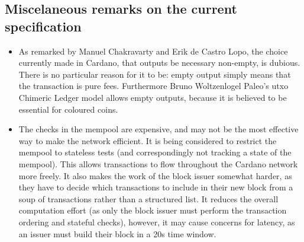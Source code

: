\documentclass{article}
\begin{document}
\subsection{Miscelaneous remarks on the current specification}
\label{sec:misc-remarks}
\begin{itemize}
\item As remarked by Manuel Chakravarty and Erik de Castro Lopo, the
  choice currently made in Cardano, that outputs be necessary
  non-empty, is dubious. There is no particular reason for it to be:
  empty output simply means that the transaction is pure
  fees. Furthermore Bruno Woltzenlogel Paleo's utxo Chimeric Ledger
  model allows empty outputs, because it is believed to be essential
  for coloured coins.
\item The checks in the mempool are expensive, and may not be the most
  effective way to make the network efficient. It is being considered
  to restrict the mempool to stateless tests (and correspondingly not
  tracking a state of the mempool). This allows transactions to flow
  throughout the Cardano network more freely. It also makes the work
  of the block issuer somewhat harder, as they have to decide which
  transactions to include in their new block from a soup of
  transactions rather than a structured list. It reduces the overall
  computation effort (as only the block issuer must perform the
  transaction ordering and stateful checks), however, it may cause
  concerns for latency, as an issuer must build their block in a 20s
  time window.
\end{itemize}
\end{document}
